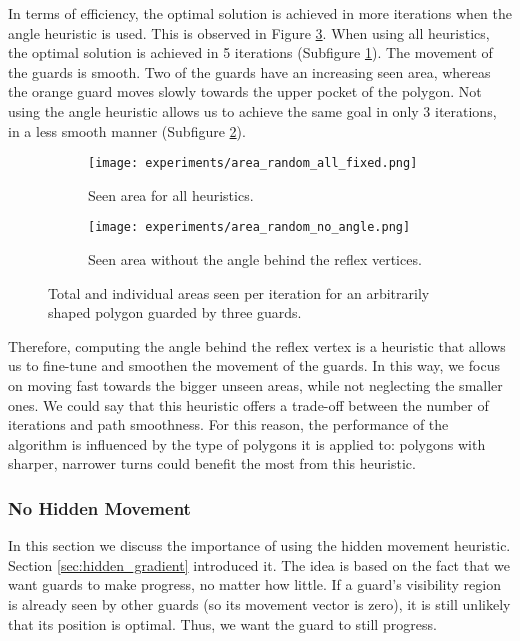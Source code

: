In terms of efficiency, the optimal solution is achieved in more iterations when the angle heuristic is used. This is observed in Figure \ref{fig:no_angle_plots}. When using all heuristics, the optimal solution is achieved in 5 iterations (Subfigure \ref{fig:area_all_angle}). The movement of the guards is smooth. Two of the guards have an increasing seen area, whereas the orange guard moves slowly towards the upper pocket of the polygon. Not using the angle heuristic allows us to achieve the same goal in only 3 iterations, in a less smooth manner (Subfigure \ref{fig:area_no_angle}).

\begin{figure}[h!]
    \begin{subfigure}{0.45\textwidth}
        \texttt{[image: experiments/area\_random\_all\_fixed.png]}
        \caption{Seen area for all heuristics.}
        \label{fig:area_all_angle}
    \end{subfigure}
    \hfill
    \begin{subfigure}{0.45\textwidth}
        \texttt{[image: experiments/area\_random\_no\_angle.png]}
        \caption{Seen area without the angle behind the reflex vertices.}
        \label{fig:area_no_angle}
    \end{subfigure}
    \caption{Total and individual areas seen per iteration for an arbitrarily shaped polygon guarded by three guards.}
    \label{fig:no_angle_plots}
\end{figure}

Therefore, computing the angle behind the reflex vertex is a heuristic that allows us to fine-tune and smoothen the movement of the guards. In this way, we  focus on moving fast towards the bigger unseen areas, while not neglecting the smaller ones. We could say that this heuristic offers a trade-off between the number of iterations and path smoothness. For this reason, the performance of the algorithm is influenced by the type of polygons it is applied to: polygons with sharper, narrower turns could benefit the most from this heuristic.


\subsubsection{No Hidden Movement}
In this section we  discuss the importance of using the hidden movement heuristic. Section \ref{sec:hidden_gradient} introduced it. The idea is based on the fact that we want guards to make progress, no matter how little. If a guard's visibility region is already seen by other guards (so its movement vector is zero), it is still unlikely that its position is optimal. Thus, we want the guard to still progress.

